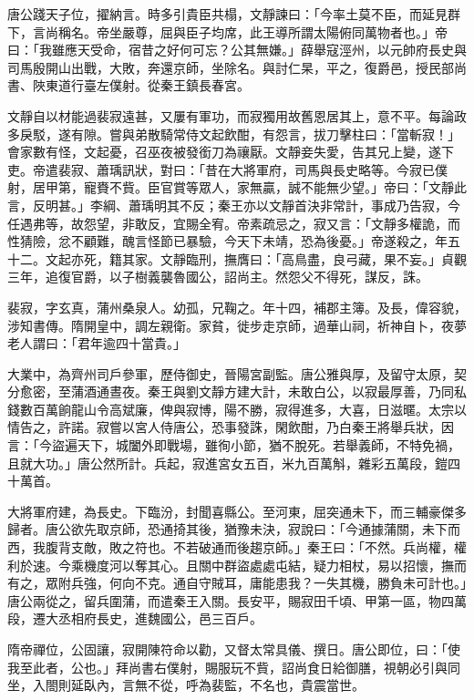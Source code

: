 \begin{pinyinscope}
 唐公踐天子位，擢納言。時多引貴臣共榻，文靜諫曰：「今率土莫不臣，而延見群下，言尚稱名。帝坐嚴尊，屈與臣子均席，此王導所謂太陽俯同萬物者也。」帝曰：「我雖應天受命，宿昔之好何可忘？公其無嫌。」薛舉寇涇州，以元帥府長史與司馬殷開山出戰，大敗，奔還京師，坐除名。與討仁杲，平之，復爵邑，授民部尚書、陜東道行臺左僕射。從秦王鎮長春宮。



 文靜自以材能過裴寂遠甚，又屢有軍功，而寂獨用故舊恩居其上，意不平。每論政多戾駁，遂有隙。嘗與弟散騎常侍文起飲酣，有怨言，拔刀擊柱曰：「當斬寂！」會家數有怪，文起憂，召巫夜被發銜刀為禳厭。文靜妾失愛，告其兄上變，遂下吏。帝遣裴寂、蕭瑀訊狀，對曰：「昔在大將軍府，司馬與長史略等。今寂已僕射，居甲第，寵賚不貲。臣官賞等眾人，家無贏，誠不能無少望。」帝曰：「文靜此言，反明甚。」李綱、蕭瑀明其不反；秦王亦以文靜首決非常計，事成乃告寂，今任遇弗等，故怨望，非敢反，宜賜全宥。帝素疏忌之，寂又言：「文靜多權詭，而性猜險，忿不顧難，醜言怪節已暴驗，今天下未靖，恐為後憂。」帝遂殺之，年五十二。文起亦死，籍其家。文靜臨刑，撫膺曰：「高鳥盡，良弓藏，果不妄。」貞觀三年，追復官爵，以子樹義襲魯國公，詔尚主。然怨父不得死，謀反，誅。



 裴寂，字玄真，蒲州桑泉人。幼孤，兄鞠之。年十四，補郡主簿。及長，偉容貌，涉知書傳。隋開皇中，調左親衛。家貧，徙步走京師，過華山祠，祈神自卜，夜夢老人謂曰：「君年逾四十當貴。」



 大業中，為齊州司戶參軍，歷侍御史，晉陽宮副監。唐公雅與厚，及留守太原，契分愈密，至蒲酒通晝夜。秦王與劉文靜方建大計，未敢白公，以寂最厚善，乃同私錢數百萬餉龍山令高斌廉，俾與寂博，陽不勝，寂得進多，大喜，日滋暱。太宗以情告之，許諾。寂嘗以宮人侍唐公，恐事發誅，閑飲酣，乃白秦王將舉兵狀，因言：「今盜遍天下，城闔外即戰場，雖徇小節，猶不脫死。若舉義師，不特免禍，且就大功。」唐公然所計。兵起，寂進宮女五百，米九百萬斛，雜彩五萬段，鎧四十萬首。



 大將軍府建，為長史。下臨汾，封聞喜縣公。至河東，屈突通未下，而三輔豪傑多歸者。唐公欲先取京師，恐通掎其後，猶豫未決，寂說曰：「今通據蒲關，未下而西，我腹背支敵，敗之符也。不若破通而後趨京師。」秦王曰：「不然。兵尚權，權利於速。今乘機度河以奪其心。且關中群盜處處屯結，疑力相杖，易以招懷，撫而有之，眾附兵強，何向不克。通自守賊耳，庸能患我？一失其機，勝負未可計也。」唐公兩從之，留兵圍蒲，而遣秦王入關。長安平，賜寂田千頃、甲第一區，物四萬段，遷大丞相府長史，進魏國公，邑三百戶。



 隋帝禪位，公固讓，寂開陳符命以勸，又督太常具儀、撰日。唐公即位，曰：「使我至此者，公也。」拜尚書右僕射，賜服玩不貲，詔尚食日給御膳，視朝必引與同坐，入閤則延臥內，言無不從，呼為裴監，不名也，貴震當世。




\end{pinyinscope}
